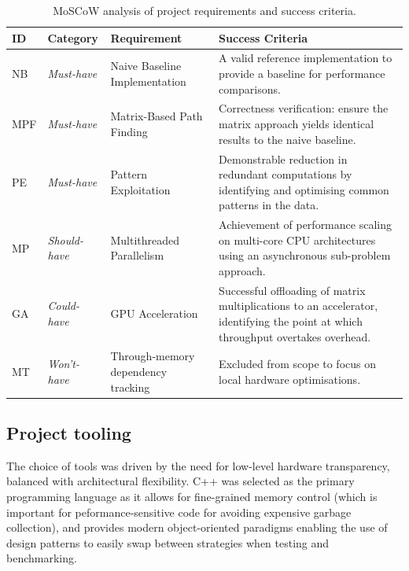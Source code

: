 \begin{table}[H]
\centering
\small %
\begin{tabularx}{\textwidth}{ll L L}
    \toprule
    \textbf{ID} & \textbf{Category} & \textbf{Requirement} & \textbf{Success Criteria} \\
    \midrule
    NB  & \textit{Must-have} & Naive Baseline Implementation & A valid reference implementation to provide a baseline for performance comparisons. \\
    \addlinespace %
    MPF & \textit{Must-have}  & Matrix-Based Path Finding & Correctness verification: ensure the matrix approach yields identical results to the naive baseline. \\
    \addlinespace
    PE  & \textit{Must-have}  & Pattern Exploitation & Demonstrable reduction in redundant computations by identifying and optimising common patterns in the data. \\
    \addlinespace
    MP  & \textit{Should-have} & Multithreaded Parallelism & Achievement of performance scaling on multi-core CPU architectures using an asynchronous sub-problem approach. \\
    \addlinespace
    GA  & \textit{Could-have}  & GPU Acceleration & Successful offloading of matrix multiplications to an accelerator, identifying the point at which throughput overtakes overhead. \\
    \addlinespace
    MT  & \textit{Won't-have}  & Through-memory dependency tracking & Excluded from scope to focus on local hardware optimisations.  \\
    \bottomrule
\end{tabularx}
\caption{MoSCoW analysis of project requirements and success criteria.}
\label{tbl:requirements-analysis}
\end{table}

\subsection{Project tooling}

The choice of tools was driven by the need for low-level hardware transparency, balanced with architectural flexibility.
C++ was selected as the primary programming language as it allows for fine-grained memory control (which is important 
for peformance-sensitive code for avoiding expensive garbage collection), and provides modern object-oriented paradigms
enabling the use of design patterns to easily swap between strategies when testing and benchmarking.

